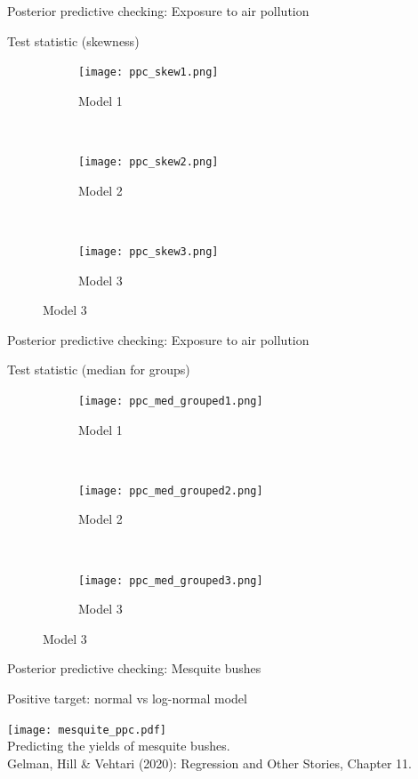 \documentclass[t]{beamer}
\begin{document}
\begin{frame}{Posterior predictive checking: Exposure to air pollution}


Test statistic (skewness)
\begin{figure}
\centering
\begin{subfigure}{0.31\textwidth}
\texttt{[image: ppc\_skew1.png]}
\caption{Model 1}
\end{subfigure}
~
\begin{subfigure}{0.31\textwidth}
\texttt{[image: ppc\_skew2.png]}
\caption{Model 2}
\end{subfigure}
~
\begin{subfigure}{0.31\textwidth}
\texttt{[image: ppc\_skew3.png]}
\caption{Model 3}
\end{subfigure}

\end{figure}

\end{frame}

\begin{frame}{Posterior predictive checking: Exposure to air pollution}


Test statistic (median for groups)

  \begin{figure}
\centering
\begin{subfigure}{.31\textwidth}
\texttt{[image: ppc\_med\_grouped1.png]}
\caption{Model 1}
\end{subfigure}
~
\begin{subfigure}{.31\textwidth}
\texttt{[image: ppc\_med\_grouped2.png]}
\caption{Model 2}
\end{subfigure}
~
\begin{subfigure}{.31\textwidth}
\texttt{[image: ppc\_med\_grouped3.png]}
\caption{Model 3}
\end{subfigure}

\end{figure}

\end{frame}

\begin{frame}{Posterior predictive checking: Mesquite bushes}

  Positive target: normal vs log-normal model
  
    \texttt{[image: mesquite\_ppc.pdf]}\\
  \vspace{-0.1\baselineskip} {Predicting the yields of mesquite bushes.\\
    \color{gray} \footnotesize
    Gelman, Hill \& Vehtari (2020): Regression and Other Stories, Chapter 11.}\\

\end{frame}
\end{document}
